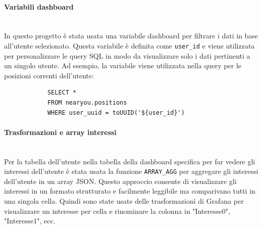 \documentclass[10pt]{article}
\newcommand{\myparagraph}[1]{\paragraph{#1}\mbox{}\\}
\begin{document}
        \myparagraph{Variabili dashboard}
        In questo progetto è stata usata una variabile dashboard per filtrare i dati in base all'utente selezionato.
        Questa variabile è definita come \texttt{user\_id} e viene utilizzata per personalizzare le query SQL in modo da visualizzare solo i dati pertinenti a un singolo utente.
        Ad esempio, la variabile viene utilizzata nella query per le posizioni correnti dell'utente:
        \begin{lstlisting}
            SELECT * 
            FROM nearyou.positions 
            WHERE user_uuid = toUUID('${user_id}')
        \end{lstlisting} 

        \myparagraph{Trasformazioni e array interessi}
        Per la tabella dell'utente nella tabella della dashboard specifica per far vedere gli interessi dell'utente è stata usata la funzione \texttt{ARRAY\_AGG} per aggregare gli interessi dell'utente in un array JSON.
        Questo approccio consente di visualizzare gli interessi in un formato strutturato e facilmente leggibile ma comparivano tutti in una singola cella.
        Quindi sono state usate delle trasformazioni di Grafana per visualizzare un interesse per cella e rinominare la colonna in "Interesse0", "Interesse1", ecc.
\end{document}
